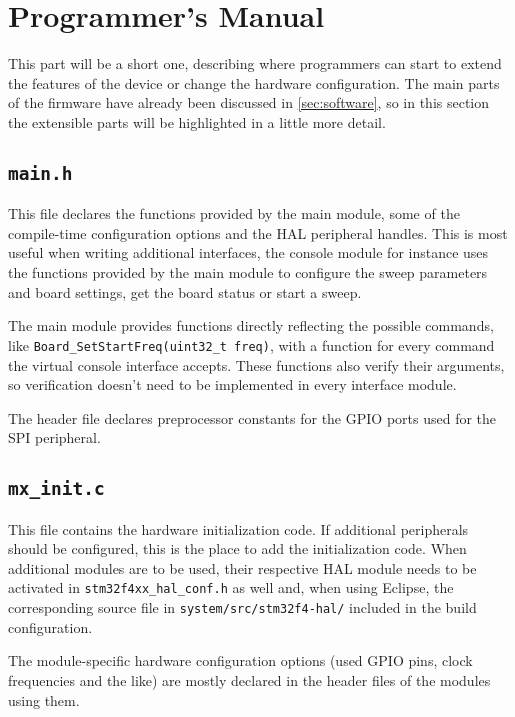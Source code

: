 \chapter{Programmer's Manual} \label{sec:api}

This part will be a short one, describing where programmers can start to extend the features of the device or
change the hardware configuration.
The main parts of the firmware have already been discussed in \autoref{sec:software}, so in this section
the extensible parts will be highlighted in a little more detail.


\section{\texttt{main.h}}

This file declares the functions provided by the main module, some of the compile-time configuration options and the
HAL peripheral handles. This is most useful when writing additional interfaces, the console module for instance uses
the functions provided by the main module to configure the sweep parameters and board settings, get the board status
or start a sweep.

The main module provides functions directly reflecting the possible commands, like
\verb!Board_SetStartFreq(uint32_t freq)!, with a function for every command the virtual console interface accepts.
These functions also verify their arguments, so verification doesn't need to be implemented in every interface module.

The header file declares preprocessor constants for the GPIO ports used for the SPI peripheral.


\section{\texttt{mx\_init.c}}

This file contains the hardware initialization code. If additional peripherals should be configured, this is the
place to add the initialization code. When additional modules are to be used, their respective HAL module needs
to be activated in \verb!stm32f4xx_hal_conf.h! as well and, when using Eclipse, the corresponding source file in
\verb!system/src/stm32f4-hal/! included in the build configuration.

The module-specific hardware configuration options (used GPIO pins, clock frequencies and the like) are mostly declared
in the header files of the modules using them.


